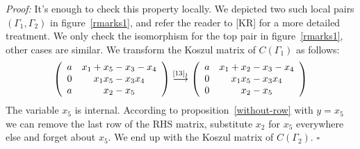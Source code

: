 \documentclass[12pt]{article}
\begin{document}
\emph{Proof:} It's enough to check this property locally. We depicted 
two such local pairs $(\Gamma_1, \Gamma_2)$ in 
figure~\ref{rmarks1}, and refer the reader to [KR] for a more 
detailed treatment. We only check the isomorphism for the top 
pair in figure~\ref{rmarks1}, other cases are similar. We transform 
the Koszul matrix of $C(\Gamma_1)$ as follows:  
$$ \left( \begin{array}{cc} a & x_1+x_5-x_3-x_4 \\ 0 & 
  x_1 x_5 -x_3 x_4 \\  a & x_2 - x_5 \end{array} 
  \right) \stackrel{[13]_1}{\longrightarrow} 
  \left( \begin{array}{cc} a & x_1+x_2-x_3-x_4 \\ 0 & 
  x_1 x_5 -x_3 x_4 \\  0 & x_2 - x_5\end{array} \right)$$
The variable $x_5$ is internal. According to 
proposition~\ref{without-row} with $y=x_5$ we can remove the last 
row of the RHS matrix, substitute $x_2$ for $x_5$ everywhere else and 
forget about $x_5.$ We end up with the Koszul matrix of $C(\Gamma_2).$ 
$\square$ 

\begin{figure}  \caption{} \label{rmarks2}
 \end{figure}

\vspace{0.1in} 
\end{document}
